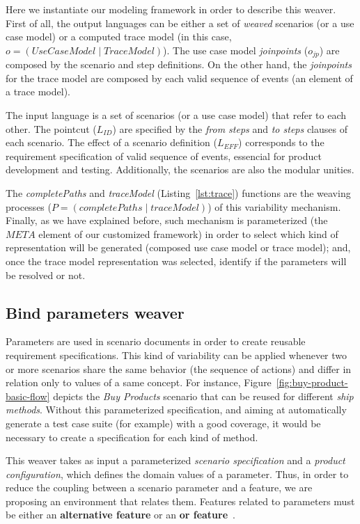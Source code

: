 \documentclass{acm_proc_article-sp}
\begin{document}
Here we instantiate our modeling framework in order to describe 
this weaver. First of all, the output languages can be either a set of \emph{weaved} scenarios (or
a use case model) or a computed trace model (in this case, $o =
(UseCaseModel \mid TraceModel)$). The use case model \emph{joinpoints} ($o_{jp}$)
are composed by the scenario and step definitions. On the other hand, the
\emph{joinpoints} for the trace model are composed by each valid
sequence of events (an element of a trace model).

The input language is a set of scenarios (or a use case model) that refer to
each other. The pointcut ($L_{ID}$) are specified by
the \emph{from steps} and \emph{to steps} clauses of each scenario. The effect 
of a scenario definition ($L_{EFF}$) corresponds
to the requirement specification of valid sequence of events, essencial
for product development and testing.  Additionally, the scenarios
are also the modular unities.

The \emph{completePaths} and \emph{traceModel}
(Listing~\ref{lst:trace}) functions are the weaving processes ($P =
(completePaths \mid traceModel)$) of this variability mechanism.
Finally, as we have explained before, such mechanism is
parameterized (the $META$ element of our customized framework) in
order to select which kind of representation will be generated
(composed use case model or trace model); and, once the trace model
representation was selected, identify if the parameters will be
resolved or not.



\subsection{Bind parameters weaver}\label{sub:bind-weaver}

Parameters are used in scenario documents in order to create reusable
requirement specifications. This kind of variability can be applied
whenever two or more scenarios share the same behavior (the sequence
of actions) and differ in relation only to values of a same concept.
For instance, Figure~\ref{fig:buy-product-basic-flow} depicts the \emph{Buy Products} 
scenario that can be reused for different \emph{ship methods}. Without this
parameterized specification, and aiming at automatically generate a test case suite (for example) with a good coverage, 
it would be necessary to create a specification for each kind of method.

This weaver takes as input a parameterized \emph{scenario specification} and a
\emph{product configuration}, which defines the domain values of a
parameter. Thus, in order to reduce the coupling between a scenario parameter 
and a feature, we are proposing an environment that
relates them. Features related to parameters 
must be either an {\bf alternative feature} or an {\bf or
feature}~\cite{gheyi-alloy-06,czarnecki-wsfactory-2005,czarnecki-book}.
\end{document}
